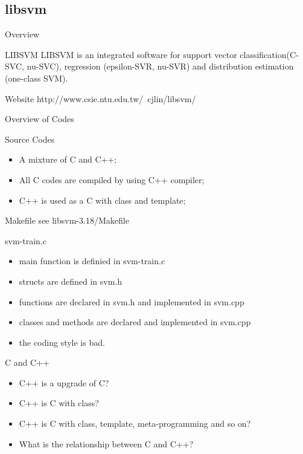 \documentclass[UTF8]{beamer}
\begin{document}
\subsection{libsvm}

\begin{frame}[t]{Overview}
\begin{block}{LIBSVM}
  LIBSVM is an integrated software for support vector
  classification(C-SVC, nu-SVC), regression (epsilon-SVR, nu-SVR) and
  distribution estimation (one-class SVM).
\end{block}

\begin{block}{Website}
  http://www.csie.ntu.edu.tw/~cjlin/libsvm/
\end{block}
\end{frame}

\begin{frame}[t]{Overview of Codes}
  \begin{block}{Source Codes}
    \begin{itemize}
      \item A mixture of C and C++;
      \item All C codes are compiled by using C++ compiler;
      \item C++ is used as a C with class and template;
    \end{itemize}
  \end{block}
\end{frame}

\begin{frame}[t]{Makefile}
  see libsvm-3.18/Makefile
\end{frame}

\begin{frame}[t]{svm-train.c}
  \begin{itemize}
    \item main function is definied in svm-train.c
    \item structs are defined in svm.h
    \item functions are declared in svm.h and implemented in svm.cpp
    \item classes and methods are declared and implemented in svm.cpp
    \pause \item the coding style is bad.
  \end{itemize}
\end{frame}

\begin{frame}[t]{C and C++}
  \begin{itemize}
    \item C++ is a upgrade of C?
    \item C++ is C with class?
    \item C++ is C with class, template, meta-programming and so on?
    \item What is the relationship between C and C++?
  \end{itemize}
\end{frame}
\end{document}

